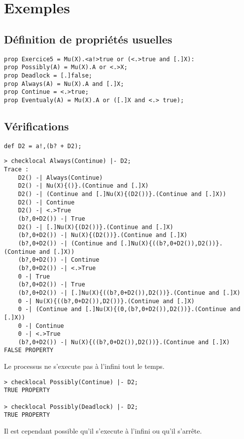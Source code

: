 \documentclass[a4paper]{article}
\begin{document}
\section{Exemples}

\subsection{Définition de propriétés usuelles}
\begin{verbatim}
prop Exercice5 = Mu(X).<a!>true or (<.>true and [.]X):
prop Possibly(A) = Mu(X).A or <.>X;
prop Deadlock = [.]false;
prop Always(A) = Nu(X).A and [.]X;
prop Continue = <.>true;
prop Eventualy(A) = Mu(X).A or ([.]X and <.> true);
\end{verbatim}

\subsection{Vérifications}
\begin{verbatim}
def D2 = a!,(b? + D2);
\end{verbatim}

\begin{verbatim}
> checklocal Always(Continue) |- D2;
Trace : 
	D2() -| Always(Continue)
	D2() -| Nu(X){()}.(Continue and [.]X)
	D2() -| (Continue and [.]Nu(X){(D2())}.(Continue and [.]X))
	D2() -| Continue
	D2() -| <.>True
	(b?,0+D2()) -| True
	D2() -| [.]Nu(X){(D2())}.(Continue and [.]X)
	(b?,0+D2()) -| Nu(X){(D2())}.(Continue and [.]X)
	(b?,0+D2()) -| (Continue and [.]Nu(X){((b?,0+D2()),D2())}.(Continue and [.]X))
	(b?,0+D2()) -| Continue
	(b?,0+D2()) -| <.>True
	0 -| True
	(b?,0+D2()) -| True
	(b?,0+D2()) -| [.]Nu(X){((b?,0+D2()),D2())}.(Continue and [.]X)
	0 -| Nu(X){((b?,0+D2()),D2())}.(Continue and [.]X)
	0 -| (Continue and [.]Nu(X){(0,(b?,0+D2()),D2())}.(Continue and [.]X))
	0 -| Continue
	0 -| <.>True
	(b?,0+D2()) -| Nu(X){((b?,0+D2()),D2())}.(Continue and [.]X)
FALSE PROPERTY
\end{verbatim}

Le processus ne s'execute pas à l'infini tout le temps.

\begin{verbatim}
> checklocal Possibly(Continue) |- D2;
TRUE PROPERTY

> checklocal Possibly(Deadlock) |- D2;
TRUE PROPERTY
\end{verbatim}

Il est cependant possible qu'il s'execute à l'infini ou qu'il s'arrête.
\end{document}
